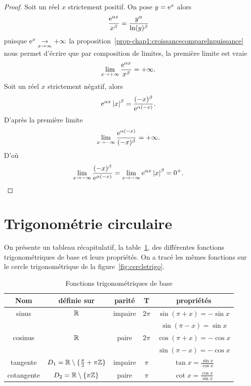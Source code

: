 \begin{proof} 
  Soit un réel $x$ strictement positif. On pose $y=\operatorname{e}^{x}$ alors 
  \begin{equation}
    \frac{\operatorname{e}^{\alpha x}}{x^\beta}=\frac{y^\alpha}{\ln(y)^\beta}
  \end{equation}
  puisque $\operatorname{e}^{x} \underset{x \to \infty}{\rightarrow}+\infty$ la proposition~\ref{prop-chap1:croissancecomparelnpuissance} nous permet d'écrire que par composition de limites, la première limite est vraie 
  \begin{equation}
    \lim\limits_{x \to + \infty} \frac{\operatorname{e}^{\alpha x}}{x^\beta}=+\infty.
  \end{equation}
  Soit un réel $x$ strictement négatif, alors 
  \begin{equation}
    \operatorname{e}^{\alpha x}\left\lvert x\right\rvert^\beta=\frac{(-x)^\beta}{\operatorname{e}^{\alpha(-x)}}.
  \end{equation}
  D'après la première limite 
  \begin{equation}
    \lim\limits_{x \to - \infty} \frac{\operatorname{e}^{\alpha (-x)}}{(-x)^\beta}=+\infty.
  \end{equation} 
  D'où 
  \begin{equation}
    \lim\limits_{x\to -\infty}\frac{(-x)^\beta}{\operatorname{e}^{\alpha (-x)}}=\lim\limits_{x \to -\infty} \operatorname{e}^{\alpha x} \left\lvert x\right\rvert^\beta=0^+.
  \end{equation}
\end{proof}
%
\section{Trigonométrie circulaire}
\label{sec:chap1-trigocirc}
On présente un tableau récapitulatif, la table~\ref{tab:fonctiontrigo}, des différentes fonctions trigonométriques de base et leurs propriétés. On a tracé les mêmes fonctions sur le cercle trigonométrique de la figure~\ref{fig:cercletrigo}.
\begin{table}[!h]
  \centering
  \begin{tabular}{|c|c|c|c|c|}
    \hline
    Nom & définie sur & parité & T & propriétés \\ \hline
    sinus & $\mathbb{R}$ & impaire & $2\pi$ & $\sin(\pi+x)=-\sin x$ \\
    & & & & $\sin(\pi-x)=\sin x$ \\ \hline
    cosinus & $\mathbb{R}$ & paire & $2\pi$ & $\cos(\pi+x)=-\cos x$\\
    & & & & $ \sin(\pi-x)=-\cos x$ \\ \hline
    tangente & $D_1=\mathbb{R}\setminus\{\frac{\pi}{2}+\pi \mathbb{Z}\}$ & impaire & $\pi$ & $\tan x =\frac{\sin x}{\cos x}$ \\ \hline
    cotangente & $D_2=\mathbb{R}\setminus\{\pi \mathbb{Z}\}$ & paire & $\pi$ & $\cot x =\frac{\cos x}{\sin x}$ \\ \hline
  \end{tabular}
  \caption{Fonctions trigonométriques de base}
  \label{tab:fonctiontrigo}
\end{table}

